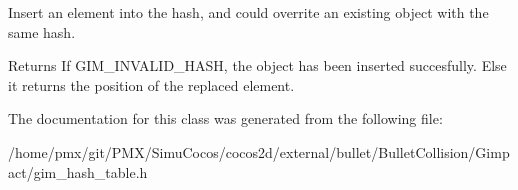 Insert an element into the hash, and could overrite an existing object with the same hash. 

\begin{DoxyReturn}{Returns}
If G\+I\+M\+\_\+\+I\+N\+V\+A\+L\+I\+D\+\_\+\+H\+A\+SH, the object has been inserted succesfully. Else it returns the position of the replaced element. 
\end{DoxyReturn}


The documentation for this class was generated from the following file\+:\begin{DoxyCompactItemize}
\item 
/home/pmx/git/\+P\+M\+X/\+Simu\+Cocos/cocos2d/external/bullet/\+Bullet\+Collision/\+Gimpact/gim\+\_\+hash\+\_\+table.\+h\end{DoxyCompactItemize}
